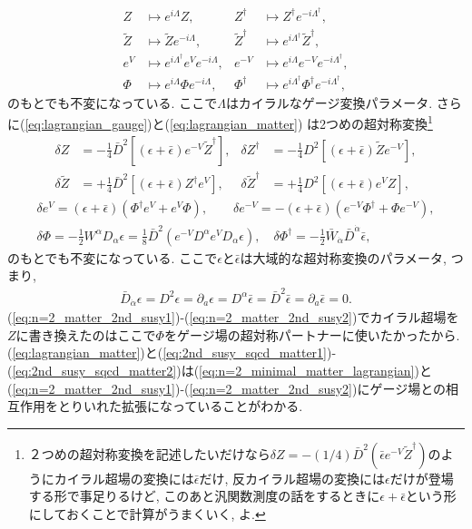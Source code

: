 \documentclass{ltjsarticle}
\theoremstyle{definition}
\begin{document}
\begin{align}
Z&\mapsto e^{i\Lambda}Z,&Z^\dagger&\mapsto Z^\dagger e^{-i\Lambda^\dagger},\\
\tilde Z&\mapsto\tilde Ze^{-i\Lambda},&\tilde Z^\dagger&\mapsto e^{i\Lambda^\dagger}\tilde Z^\dagger,\\
e^V&\mapsto e^{i\Lambda^\dagger}e^Ve^{-i\Lambda},&e^{-V}&\mapsto e^{i\Lambda}e^{-V}e^{-i\Lambda^\dagger},\\
\Phi&\mapsto e^{i\Lambda}\Phi e^{-i\Lambda},&\Phi^\dagger&\mapsto e^{i\Lambda^\dagger}\Phi^\dagger e^{-i\Lambda^\dagger},
\end{align}
のもとでも不変になっている. ここで$\Lambda$はカイラルなゲージ変換パラメータ. さらに(\ref{eq:lagrangian_gauge})と(\ref{eq:lagrangian_matter}) は2つめの超対称変換\footnote{
２つめの超対称変換を記述したいだけなら$\delta Z=-(1/4)\bar D^2(\bar\epsilon e^{-V}\tilde Z^\dagger)$のようにカイラル超場の変換には$\bar\epsilon$だけ, 反カイラル超場の変換には$\epsilon$だけが登場する形で事足りるけど, このあと汎関数測度の話をするときに$\epsilon+\bar\epsilon$という形にしておくことで計算がうまくいく, よ.
}
\begin{align}
\delta Z&=-\frac14\bar D^2\left[(\epsilon+\bar\epsilon)e^{-V}\tilde Z^\dagger\right],& \delta Z^\dagger&=-\frac14D^2\left[(\epsilon+\bar\epsilon)\tilde Ze^{-V}\right],\label{eq:2nd_susy_sqcd_matter1}\\
\delta\tilde Z&=+\frac14\bar D^2\left[(\epsilon+\bar\epsilon)Z^\dagger e^V\right],&\delta\tilde Z^\dagger&=+\frac14D^2\left[(\epsilon+\bar\epsilon)e^VZ\right],\label{eq:2nd_susy_sqcd_matter2}
\end{align}
\begin{gather}
\delta e^V=(\epsilon+\bar\epsilon)\left(\Phi^\dagger e^V+e^V\Phi\right),\qquad \delta e^{-V}=-(\epsilon+\bar\epsilon)\left(e^{-V}\Phi^\dagger+\Phi e^{-V}\right),\\
\delta\Phi=-\frac12W^\alpha D_\alpha\epsilon=\frac18\bar D^2\left(e^{-V}D^\alpha e^VD_\alpha\epsilon\right),\quad\delta\Phi^\dagger=-\frac12\bar W_{\dot\alpha}\bar D^{\dot\alpha}\bar\epsilon,
\end{gather}
のもとでも不変になっている. ここで$\epsilon$と$\bar\epsilon$は大域的な超対称変換のパラメータ, つまり,
\begin{gather}
\bar D_{\dot\alpha}\epsilon=D^2\epsilon=\partial_a\epsilon=D^\alpha\bar\epsilon=\bar D^2\bar\epsilon=\partial_a\bar\epsilon=0.
\end{gather}
(\ref{eq:n=2_matter_2nd_susy1})-(\ref{eq:n=2_matter_2nd_susy2})でカイラル超場を$Z$に書き換えたのはここで$\Phi$をゲージ場の超対称パートナーに使いたかったから. (\ref{eq:lagrangian_matter})と(\ref{eq:2nd_susy_sqcd_matter1})-(\ref{eq:2nd_susy_sqcd_matter2})は(\ref{eq:n=2_minimal_matter_lagrangian})と(\ref{eq:n=2_matter_2nd_susy1})-(\ref{eq:n=2_matter_2nd_susy2})にゲージ場との相互作用をとりいれた拡張になっていることがわかる.\par
\end{document}
